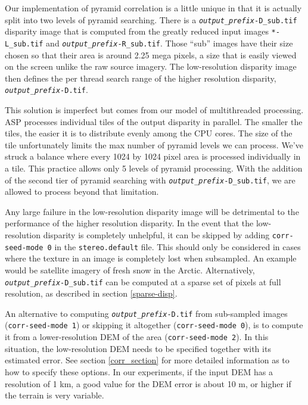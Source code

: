 Our implementation of pyramid correlation is a little unique in that
it is actually split into two levels of pyramid searching. There is a
\texttt{\textit{output\_prefix}-D\_sub.tif} disparity image that is
computed from the greatly reduced input images \texttt{*-L\_sub.tif}
and \texttt{\textit{output\_prefix}-R\_sub.tif}. Those ``sub'' images
have their size chosen so that their area is around 2.25 mega pixels,
a size that is easily viewed on the screen unlike the raw source
imagery. The low-resolution disparity image then defines the per
thread search range of the higher resolution disparity,
\texttt{\textit{output\_prefix}-D.tif}.

This solution is imperfect but comes from our model of multithreaded
processing. ASP processes individual tiles of the output disparity
in parallel. The smaller the tiles, the easier it is to distribute
evenly among the CPU cores. The size of the tile unfortunately
limits the max number of pyramid levels we can process. We've struck
a balance where every 1024 by 1024 pixel area is processed individually
in a tile. This practice allows only 5 levels of pyramid processing.
With the addition of the second tier of pyramid searching with
\texttt{\textit{output\_prefix}-D\_sub.tif}, we are allowed to
process beyond that limitation.

Any large failure in the low-resolution disparity image will be
detrimental to the performance of the higher resolution disparity. In
the event that the low-resolution disparity is completely unhelpful, it
can be skipped by adding \texttt{corr-seed-mode 0} in the
\texttt{stereo.default} file. This should only be considered in cases
where the texture in an image is completely lost when subsampled. An
example would be satellite imagery of fresh snow in the
Arctic. Alternatively, \texttt{\textit{output\_prefix}-D\_sub.tif} can
be computed at a sparse set of pixels at full resolution, as described
in section \ref{sparse-disp}.

An alternative to computing \texttt{\textit{output\_prefix}-D.tif}
from sub-sampled images (\texttt{corr-seed-mode 1}) or skipping it
altogether (\texttt{corr-seed-mode 0}), is to compute it from a
lower-resolution DEM of the area (\texttt{corr-seed-mode 2}). In this
situation, the low-resolution DEM needs to be specified together with its estimated
error. See section \ref{corr_section} for more detailed information as
to how to specify these options. In our experiments, if the input DEM
has a resolution of 1 km, a good value for the DEM error is about 10 m,
or higher if the terrain is very variable.

